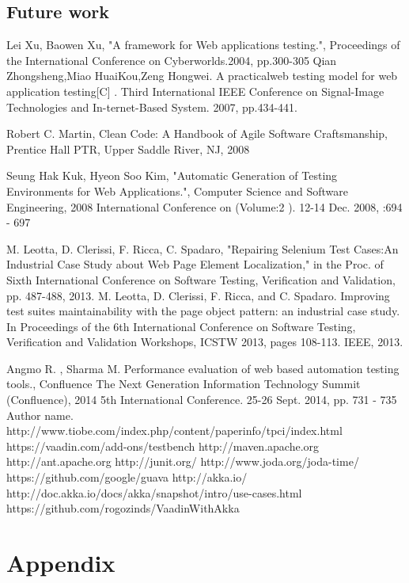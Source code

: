 \documentclass{article}
\begin{document}
 	\subsection {Future work}
 	
 	
	\begin{thebibliography}{7}
	
			Lei Xu, Baowen Xu,
			"A framework for Web applications testing.",
			Proceedings of the International Conference on Cyberworlds.2004, pp.300-305
		Qian Zhongsheng,Miao HuaiKou,Zeng Hongwei.
		 A practicalweb testing model for web application testing[C] .
		 Third International IEEE Conference on Signal-Image Technologies and
		 In-ternet-Based System. 2007, pp.434-441.
		 
		Robert C. Martin,
		Clean Code: A Handbook of Agile Software Craftsmanship,
		Prentice Hall PTR, Upper Saddle River, NJ, 2008
		
		Seung Hak Kuk, Hyeon Soo Kim,			
		"Automatic Generation of Testing Environments for Web Applications.",
		Computer Science and Software Engineering, 2008 International Conference on
		(Volume:2 ). 12-14 Dec. 2008, :694 - 697
		
		M. Leotta, D. Clerissi, F. Ricca, C. Spadaro,
		"Repairing Selenium Test Cases:An Industrial Case Study about Web Page
		 Element Localization," in the Proc. of Sixth International Conference on Software Testing, Verification and Validation, pp. 487-488, 2013. 
		M. Leotta, D. Clerissi, F. Ricca, and C. Spadaro. Improving test suites
		maintainability with the page object pattern: an industrial case study.
		In Proceedings of the 6th International Conference on Software Testing, Verification and Validation Workshops,
		ICSTW 2013, pages 108-113. IEEE, 2013. 
		
		
		Angmo R. , Sharma M.	
		Performance evaluation of web based automation testing tools.,
		Confluence The Next Generation Information Technology Summit (Confluence),
		2014 5th International Conference. 25-26 Sept. 2014, pp. 731 - 735
		 Author name.
		http://www.tiobe.com/index.php/content/paperinfo/tpci/index.html
		https://vaadin.com/add-ons/testbench
		http://maven.apache.org
		http://ant.apache.org
		http://junit.org/
		http://www.joda.org/joda-time/
		https://github.com/google/guava
		http://akka.io/
		http://doc.akka.io/docs/akka/snapshot/intro/use-cases.html
		https://github.com/rogozinds/VaadinWithAkka
	\end{thebibliography}
  \section {Appendix}
  
\end{document}
